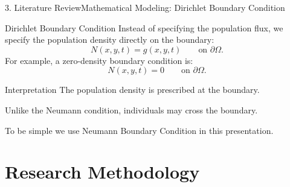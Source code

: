 \documentclass[10pt]{beamer}
\begin{document}
    \begin{frame}{3. Literature Review}{Mathematical Modeling: Dirichlet Boundary Condition}
      \begin{block}{Dirichlet Boundary Condition}
          Instead of specifying the population flux, we specify the population density directly on the boundary:
          $$
          N(x,y,t)=g(x,y,t)
          \qquad \text{on } \partial\Omega.
          $$
          For example, a zero-density boundary condition is:
          $$
          N(x,y,t)=0
          \qquad \text{on } \partial\Omega.
          $$
      \end{block}
      \begin{block}{Interpretation}
          The population density is prescribed at the boundary.

          Unlike the Neumann condition, individuals may cross the boundary.

          To be simple we use Neumann Boundary Condition in this presentation.
      \end{block}
    \end{frame}

\section{Research Methodology}
\end{document}
